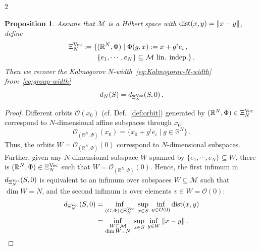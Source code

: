 \documentclass{article}
\newtheorem{proof}{Proof}[theorem]
\newtheorem{proposition}[theorem]{Proposition}
\newcommand{\M}{\mathcal{M}}                                %
\newcommand{\R}{\mathbb{R}}                                 %
\newcommand{\state}{x}
\begin{document}
\begin{multicols}{2}
\begin{proposition}
    Assume that $\M$ is a Hilbert space with $\textnormal{dist}(x,y) = \|x - y\|$, define  
    \begin{align}
        \Xi^{\textnormal{Vec}}_N := \{&(\R^N,\Phi)\;|\; \Phi(g,x) := x + g^i e_i\,, \\ 
        & \{e_1,\cdots,e_N\} \subseteq \M \textnormal{ lin. indep.} \}\,. \nonumber
    \end{align} 
    Then we recover the Kolmogorov $N$-width~\eqref{eq:Kolmogorov-N-width} from~\eqref{eq:group-width}
    \begin{equation}
        d_N(S) = d_{\Xi^\textnormal{Vec}_N}(S,0)\,.
    \end{equation}
\end{proposition}
\begin{proof}
    Different orbits $\mathcal{O}(\state_0)$ (cf. Def.~\ref{def:orbit}) generated by $(\R^N,\Phi) \in \Xi^{\textnormal{Vec}}_N$ correspond to $N$-dimensional affine subspaces through $\state_0$:
    \begin{equation}
        \mathcal{O}_{(\R^N,\Phi)}(\state_0) = \{\state_0 + g^i e_i \;|\; g \in \R^N \}\,.
    \end{equation}
    Thus, the orbits $W = \mathcal{O}_{(\R^N,\Phi)}(0)$ correspond to $N$-dimensional subspaces. Further, given any $N$-dimensional subspace $W$ spanned by $\{e_1,\cdots,e_N\}\subseteq W$, there is $(\R^N,\Phi)\in\Xi^{\textnormal{Vec}}_N$ such that $W = \mathcal{O}_{(\R^N,\Phi)}(0)$. Hence, the first infimum in $d_{\Xi^\textnormal{Vec}_N}(S,0)$ %
    is equivalent to an infimum over subspaces $W \subseteq \M$ such that $\dim W = N$, and the second infimum is over elements $v \in W = \mathcal{O}(0)$:
    \begin{align}
        d_{\Xi^\textnormal{Vec}_N}(S,0) 
        & = \inf_{\substack{(G,\Phi) \in \Xi^{\textnormal{Vec}}_N}}\; \sup_{\state \in S}\; \inf_{y \in \mathcal{O}(0)} \textnormal{dist}(\state,y) \\
        & = \inf_{\substack{W \subseteq \M  \\ \dim W = N}}\; \sup_{\state \in S}\; \inf_{y \in W} \|\state - y\| \,.
    \end{align}
\end{proof}


\end{multicols}
\end{document}
